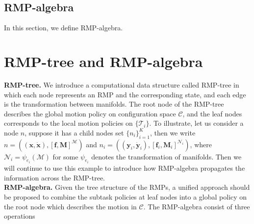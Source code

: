 \subsection{RMP-algebra}
In this section, we define RMP-algebra.

\section{RMP-tree and RMP-algebra}

\textbf{RMP-tree.} We introduce a computational data structure called RMP-tree in which each node represents an RMP and the corresponding state, and each edge is the transformation between manifolds. The root node of the RMP-tree describes the global motion policy on configuration space $\mathcal{C}$, and the leaf nodes corresponds to the local motion policies on $\{\mathcal{T}_i\}$. To illustrate, let us consider a node $n$, suppose it has a child nodes set $\{n_i\}_{i=1}^{K}$, then we write $n=((\mathbf{x}, \dot{\mathbf{x}}), [\mathbf{f}, \mathbf{M}]^{\mathcal{M}})$ and $n_i = ((\mathbf{y}_i, \dot{\mathbf{y}}_i), [\mathbf{f}_i, \mathbf{M}_i]^{\mathcal{N}_i})$, where $\mathcal{N}_i = \psi_{e_i}(\mathcal{M})$ for some $\psi_{e_i}$ denotes the transformation of manifolds. Then we will continue to use this example to introduce how RMP-algebra propagates the information across the RMP-tree. \\[3mm]
\textbf{RMP-algebra.} Given the tree structure of the RMPs, a unified approach should be proposed to combine the subtask policies at leaf nodes into a global policy on the root node which describes the motion in $\mathcal{C}$. The RMP-algebra consist of three operations

